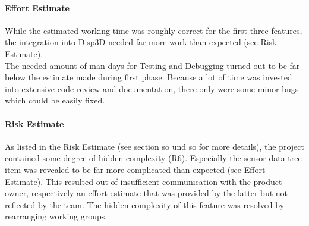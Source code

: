 \paragraph{Effort Estimate}

While the estimated working time was roughly correct for the first three features, the integration into Disp3D needed far more work than expected (see Risk Estimate).\\
The needed amount of man days for Testing and Debugging turned out to be far below the estimate made during first phase. Because a lot of time was invested into extensive code review and documentation, there only were some minor bugs which could be easily fixed.


\paragraph{Risk Estimate}

As listed in the Risk Estimate (see section so und so for more details), the project contained some degree of hidden complexity (R6). Especially the sensor data tree item was revealed to be far more complicated than expected (see Effort Estimate). This resulted out of insufficient communication with the product owner, respectively an effort estimate that was provided by the latter but not reflected by the team. The hidden complexity of this feature was resolved by rearranging working groups.
